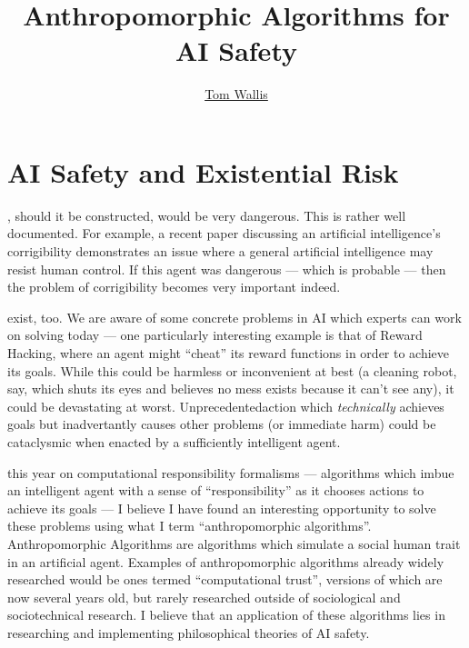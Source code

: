 
\title{Anthropomorphic Algorithms for AI Safety}
\author[Tom Wallis]{\href{http://tom.coffee}{Tom Wallis}}
\date{}



\maketitle

\section{AI Safety and Existential Risk}

, should it be constructed, would be very dangerous. This is rather well documented. For example, a recent paper discussing an artificial intelligence's corrigibility\cite{corrigability} demonstrates an issue where a general artificial intelligence may resist human control. If this agent was dangerous --- which is probable --- then the problem of corrigibility becomes very important indeed.\par

 exist, too. We are aware of some concrete problems in AI which experts can work on solving today\cite{concrete_problems} --- one particularly interesting example is that of Reward Hacking, where an agent might ``cheat'' its reward functions in order to achieve its goals. While this could be harmless or inconvenient at best (a cleaning robot, say, which shuts its eyes and believes no mess exists because it can't see any), it could be devastating at worst. Unprecedentedaction which \emph{technically} achieves goals but inadvertantly causes other problems (or immediate harm) could be cataclysmic when enacted by a sufficiently intelligent agent.\par

 this year on computational responsibility formalisms --- algorithms which imbue an intelligent agent with a sense of ``responsibility'' as it chooses actions to achieve its goals --- I believe I have found an interesting opportunity to solve these problems using what I term ``anthropomorphic algorithms''. Anthropomorphic Algorithms are algorithms which simulate a social human trait in an artificial agent. Examples of anthropomorphic algorithms already widely researched would be ones termed ``computational trust'', versions of which are now several years old\cite{marsh1994}, but rarely researched outside of sociological and sociotechnical research. I believe that an application of these algorithms lies in researching and implementing philosophical theories of AI safety. \par

